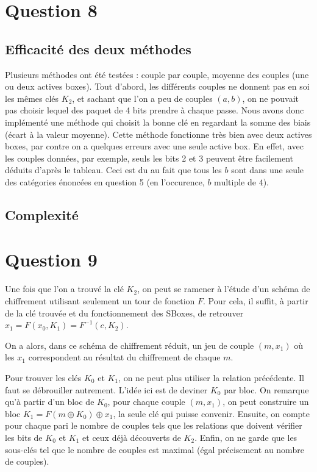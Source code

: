 \section*{Question 8}

\subsection*{Efficacité des deux méthodes}

Plusieurs méthodes ont été testées : couple par couple, moyenne des couples (une ou deux actives boxes). Tout d'abord, les différents couples ne donnent pas en soi les mêmes clés $K_2$, et sachant que l'on a peu de couples $(a,b)$, on ne pouvait pas choisir lequel des paquet de 4 bits prendre à chaque passe. Nous avons donc implémenté une méthode qui choisit la bonne clé en regardant la somme des biais (écart à la valeur moyenne). Cette méthode fonctionne très bien avec deux actives boxes, par contre on a quelques erreurs avec une seule active box. En effet, avec les couples données, par exemple, seuls les bits 2 et 3 peuvent être facilement déduits d'après le tableau. Ceci est du au fait que tous les $b$ sont dans une seule des catégories énoncées en question 5 (en l'occurence, $b$ multiple de $4$).

\subsection*{Complexité}


\section*{Question 9}

Une fois que l'on a trouvé la clé $K_2$, on peut se ramener à l'étude d'un schéma de chiffrement utilisant seulement un tour de fonction $F$. Pour cela, il suffit, à partir de la clé trouvée et du fonctionnement des SBoxes, de retrouver $x_1 = F(x_0,K_1) = F^{-1}(c,K_2)$.

On a alors, dans ce schéma de chiffrement réduit, un jeu de couple $(m,x_1)$ où les $x_1$ correspondent au résultat du chiffrement de chaque $m$.

Pour trouver les clés $K_0$ et $K_1$, on ne peut plus utiliser la relation précédente. Il faut se débrouiller autrement. L'idée ici est de deviner $K_0$ par bloc. On remarque qu'à partir d'un bloc de $K_0$, pour chaque couple $(m,x_1)$, on peut construire un bloc $K_1 = F(m \oplus K_0) \oplus x_1$, la seule clé qui puisse convenir. Ensuite, on compte pour chaque pari le nombre de couples tels que les relations que doivent vérifier les bits de $K_0$ et $K_1$ et ceux déjà découverts de $K_2$. Enfin, on ne garde que les sous-clés tel que le nombre de couples est maximal (égal précisement au nombre de couples).	

